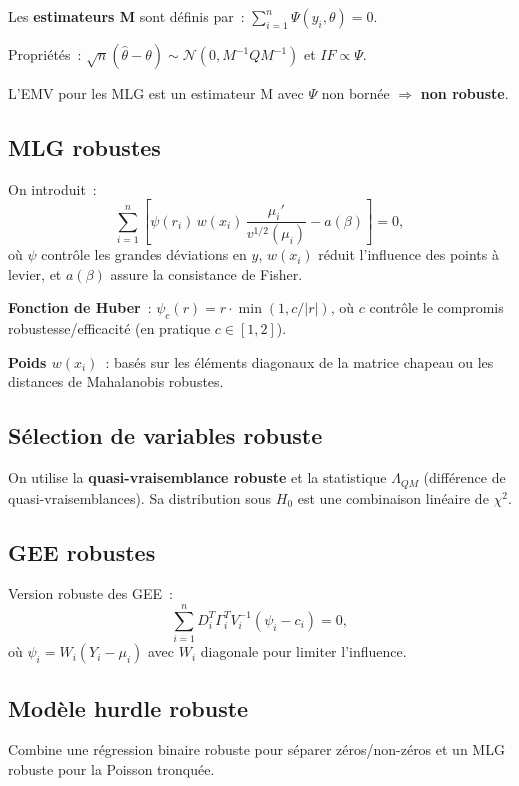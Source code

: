 \documentclass[11pt,letterpaper]{article}
\begin{document}
Les \textbf{estimateurs M} sont définis par~: $\sum_{i=1}^n \Psi(y_i, \theta) = 0$.

Propriétés~: $\sqrt{n}(\hat{\theta}-\theta) \sim \mathcal{N}(0, M^{-1}QM^{-1})$ et $IF \propto \Psi$.

L'EMV pour les MLG est un estimateur M avec $\Psi$ non bornée $\Rightarrow$ \textbf{non robuste}.

\subsection{MLG robustes}

On introduit~:
$$\sum_{i=1}^n \left[\psi(r_i)\,w(x_i)\,\frac{\mu_i'}{v^{1/2}(\mu_i)} - a(\beta)\right] = 0,$$
où $\psi$ contrôle les grandes déviations en $y$, $w(x_i)$ réduit l'influence des points à levier, et $a(\beta)$ assure la consistance de Fisher.

\textbf{Fonction de Huber}~: $\psi_c(r) = r\cdot\min(1, c/|r|)$, où $c$ contrôle le compromis robustesse/efficacité (en pratique $c \in [1,2]$).

\textbf{Poids $w(x_i)$}~: basés sur les éléments diagonaux de la matrice chapeau ou les distances de Mahalanobis robustes.

\subsection{Sélection de variables robuste}

On utilise la \textbf{quasi-vraisemblance robuste} et la statistique $\Lambda_{QM}$ (différence de quasi-vraisemblances). Sa distribution sous $H_0$ est une combinaison linéaire de $\chi^2$.

\subsection{GEE robustes}

Version robuste des GEE~:
$$\sum_{i=1}^n D_i^T \Gamma_i^T V_i^{-1}(\psi_i - c_i) = 0,$$
où $\psi_i = W_i(Y_i - \mu_i)$ avec $W_i$ diagonale pour limiter l'influence.

\subsection{Modèle hurdle robuste}

Combine une régression binaire robuste pour séparer zéros/non-zéros et un MLG robuste pour la Poisson tronquée.

\newpage
\end{document}
